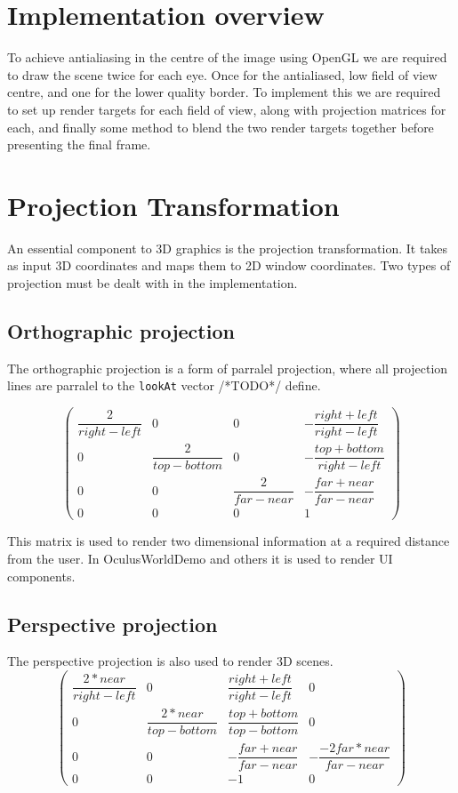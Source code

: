 \documentclass[12pt,a4paper,twoside,openright]{report}
\begin{document}
\section{Implementation overview} 

To achieve antialiasing in the centre of the image using OpenGL we are required to draw the scene twice for each eye. Once for the antialiased, low field of view centre, and one for the lower quality border. To implement this we are required to set up render targets for each field of view, along with projection matrices for each, and finally some method to blend the two render targets together before presenting the final frame.

\section{Projection Transformation}

An essential component to 3D graphics is the projection transformation. It takes as input 3D coordinates and maps them to 2D window coordinates.
Two types of projection must be dealt with in the implementation. 

\subsection{Orthographic projection}
The orthographic projection is a form of parralel projection, where all projection lines are parralel to the \texttt{lookAt} vector /*TODO*/ define. 

\[
\begin{pmatrix}
\dfrac{2}{right-left} & 0 & 0 & -\dfrac{right+left}{right-left} \\
0 & \dfrac{2}{top-bottom} & 0 & -\dfrac{top+bottom}{right-left} \\
0 & 0 & \dfrac{2}{far-near} & -\dfrac{far + near}{far-near} \\
0 & 0 & 0 & 1
\end{pmatrix}
\]

This matrix is used to render two dimensional information at a required distance from the user. In OculusWorldDemo and others it is used to render UI components.
\subsection{Perspective projection}

The perspective projection is also used to render 3D scenes.
\[
\begin{pmatrix}
\dfrac{2*near}{right-left} & 0 & \dfrac{right + left}{right - left} & 0 \\
0 & \dfrac{2*near}{top-bottom} & \dfrac{top+bottom}{top-bottom} & 0 \\
0 & 0 & -\dfrac{far + near}{far-near} & -\dfrac{-2far*near}{far-near} \\
0 & 0 & -1 & 0
\end{pmatrix}
\]
\end{document}
